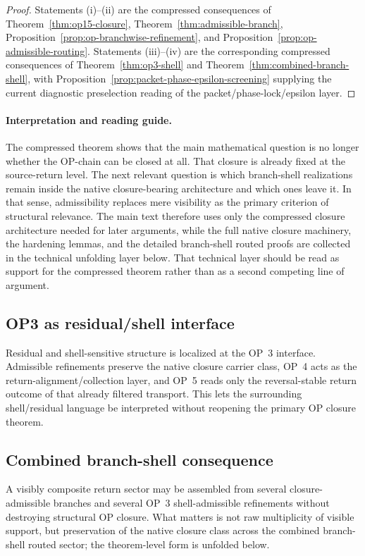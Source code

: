 \begin{proof}
Statements (i)--(ii) are the compressed consequences of Theorem~\ref{thm:op15-closure}, Theorem~\ref{thm:admissible-branch}, Proposition~\ref{prop:op-branchwise-refinement}, and Proposition~\ref{prop:op-admissible-routing}. Statements (iii)--(iv) are the corresponding compressed consequences of Theorem~\ref{thm:op3-shell} and Theorem~\ref{thm:combined-branch-shell}, with Proposition~\ref{prop:packet-phase-epsilon-screening} supplying the current diagnostic preselection reading of the packet/phase-lock/epsilon layer.
\end{proof}

\paragraph{Interpretation and reading guide.}
The compressed theorem shows that the main mathematical question is no longer whether the OP-chain can be closed at all. That closure is already fixed at the source-return level. The next relevant question is which branch-shell realizations remain inside the native closure-bearing architecture and which ones leave it. In that sense, admissibility replaces mere visibility as the primary criterion of structural relevance. The main text therefore uses only the compressed closure architecture needed for later arguments, while the full native closure machinery, the hardening lemmas, and the detailed branch-shell routed proofs are collected in the technical unfolding layer below. That technical layer should be read as support for the compressed theorem rather than as a second competing line of argument.

\subsection{OP3 as residual/shell interface}
\label{sec:op3-interface-main}
Residual and shell-sensitive structure is localized at the OP~3 interface. Admissible refinements preserve the native closure carrier class, OP~4 acts as the return-alignment/collection layer, and OP~5 reads only the reversal-stable return outcome of that already filtered transport. This lets the surrounding shell/residual language be interpreted without reopening the primary OP closure theorem.

\subsection{Combined branch-shell consequence}
\label{sec:combined-branch-shell-main}
A visibly composite return sector may be assembled from several closure-admissible branches and several OP~3 shell-admissible refinements without destroying structural OP closure. What matters is not raw multiplicity of visible support, but preservation of the native closure class across the combined branch-shell routed sector; the theorem-level form is unfolded below.

